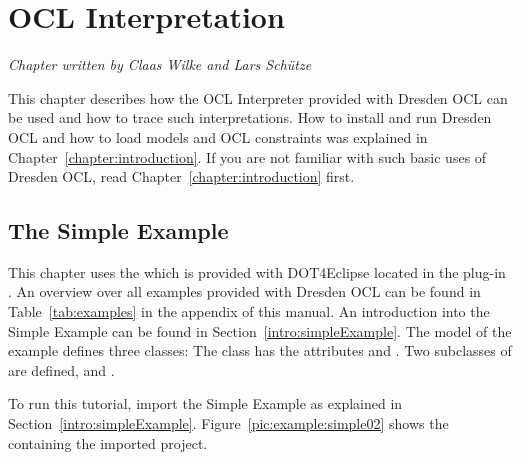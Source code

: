 \chapter{OCL Interpretation}
\label{chapter:interpretation}

\begin{flushright}
\textit{Chapter written by Claas Wilke and Lars Sch\"{u}tze}
\end{flushright}

This chapter describes how the \acs{OCL} Interpreter provided with Dresden OCL 
can be used and how to trace such interpretations. How to install and run Dresden OCL and how 
to load models and OCL constraints was explained in 
Chapter~\ref{chapter:introduction}. If you are not familiar with such basic uses
of Dresden OCL, read Chapter~\ref{chapter:introduction} first.



\section{The Simple Example}

This chapter uses the  which is provided with 
\acl{DOT4Eclipse} located in the plug-in 
. An overview over
all examples provided with Dresden OCL can be found in 
Table~\ref{tab:examples} in the appendix of this manual. An introduction into
the Simple Example can be found in Section~\ref{intro:simpleExample}. The model 
of the example defines three classes: The class  has the 
attributes  and . Two subclasses of  are 
defined,  and .

To run this tutorial, import the Simple Example as explained in
Section~\ref{intro:simpleExample}. Figure~\ref{pic:example:simple02} shows the
 containing the imported project.

